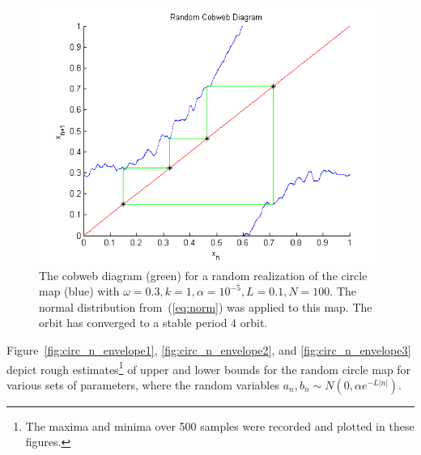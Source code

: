 \begin{figure}[htp]
\caption[Random circle map, stable orbit under the normal distribution]{The cobweb
  diagram (green) for a random realization of the circle map (blue) with $\omega =
  0.3, k=1, \alpha = 10^{-5}, L=0.1, N=100$. The normal distribution
  from~(\ref{eq:norm}) was applied to this map. The orbit has converged to a stable period 4 orbit. }\label{fig:rcircstable_norm}
	\begin{center}
		\includegraphics[scale=0.65]{figs/randcirc_norm_cobweb.png}
	\end{center}
\end{figure}
Figure~\ref{fig:circ_n_envelope1}, \ref{fig:circ_n_envelope2}, and \ref{fig:circ_n_envelope3} depict rough estimates\footnote{The
  maxima and minima over 500 samples were recorded and plotted in
  these figures.} of upper and lower bounds for the random circle map
for various sets of parameters, where the random variables
$a_n,b_n\sim N(0,\alpha e^{-L|n|})$.
